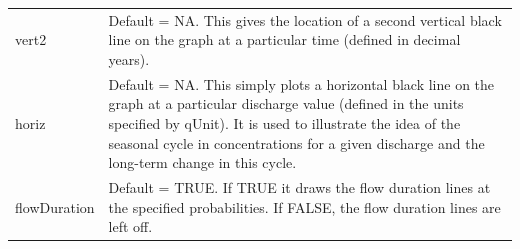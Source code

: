 \documentclass[a4paper,11pt]{article}\usepackage{graphicx, color}
\begin{document}
\begin{table}[ht]
\begin{tabularx}{\textwidth}{lX}
vert2 & Default = NA.  This gives the location of a second vertical black line on the graph at a particular time (defined in decimal years). \\
horiz & Default = NA.  This simply plots a horizontal black line on the graph at a particular discharge value (defined in the units specified by qUnit).  It is used to illustrate the idea of the seasonal cycle in concentrations for a given discharge and the long-term change in this cycle.  \\
flowDuration & Default = TRUE.  If TRUE it draws the flow duration lines at the specified probabilities.  If FALSE, the flow duration lines are left off.\\
\hline
\end{tabularx}

\end{table}
\end{document}
